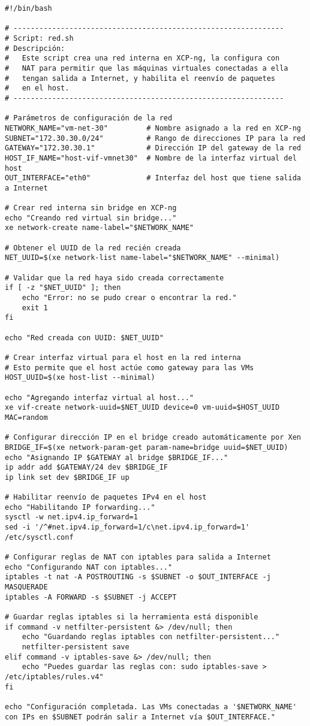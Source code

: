 \begin{verbatim}
#!/bin/bash

# ---------------------------------------------------------------
# Script: red.sh
# Descripción:
#   Este script crea una red interna en XCP-ng, la configura con
#   NAT para permitir que las máquinas virtuales conectadas a ella
#   tengan salida a Internet, y habilita el reenvío de paquetes 
#   en el host.
# ---------------------------------------------------------------

# Parámetros de configuración de la red
NETWORK_NAME="vm-net-30"         # Nombre asignado a la red en XCP-ng
SUBNET="172.30.30.0/24"          # Rango de direcciones IP para la red
GATEWAY="172.30.30.1"            # Dirección IP del gateway de la red
HOST_IF_NAME="host-vif-vmnet30"  # Nombre de la interfaz virtual del host
OUT_INTERFACE="eth0"             # Interfaz del host que tiene salida a Internet

# Crear red interna sin bridge en XCP-ng
echo "Creando red virtual sin bridge..."
xe network-create name-label="$NETWORK_NAME"

# Obtener el UUID de la red recién creada
NET_UUID=$(xe network-list name-label="$NETWORK_NAME" --minimal)

# Validar que la red haya sido creada correctamente
if [ -z "$NET_UUID" ]; then
    echo "Error: no se pudo crear o encontrar la red."
    exit 1
fi

echo "Red creada con UUID: $NET_UUID"

# Crear interfaz virtual para el host en la red interna
# Esto permite que el host actúe como gateway para las VMs
HOST_UUID=$(xe host-list --minimal)

echo "Agregando interfaz virtual al host..."
xe vif-create network-uuid=$NET_UUID device=0 vm-uuid=$HOST_UUID MAC=random

# Configurar dirección IP en el bridge creado automáticamente por Xen
BRIDGE_IF=$(xe network-param-get param-name=bridge uuid=$NET_UUID)
echo "Asignando IP $GATEWAY al bridge $BRIDGE_IF..."
ip addr add $GATEWAY/24 dev $BRIDGE_IF
ip link set dev $BRIDGE_IF up

# Habilitar reenvío de paquetes IPv4 en el host
echo "Habilitando IP forwarding..."
sysctl -w net.ipv4.ip_forward=1
sed -i '/^#net.ipv4.ip_forward=1/c\net.ipv4.ip_forward=1' /etc/sysctl.conf

# Configurar reglas de NAT con iptables para salida a Internet
echo "Configurando NAT con iptables..."
iptables -t nat -A POSTROUTING -s $SUBNET -o $OUT_INTERFACE -j MASQUERADE
iptables -A FORWARD -s $SUBNET -j ACCEPT

# Guardar reglas iptables si la herramienta está disponible
if command -v netfilter-persistent &> /dev/null; then
    echo "Guardando reglas iptables con netfilter-persistent..."
    netfilter-persistent save
elif command -v iptables-save &> /dev/null; then
    echo "Puedes guardar las reglas con: sudo iptables-save > /etc/iptables/rules.v4"
fi

echo "Configuración completada. Las VMs conectadas a '$NETWORK_NAME' con IPs en $SUBNET podrán salir a Internet vía $OUT_INTERFACE."
\end{verbatim}